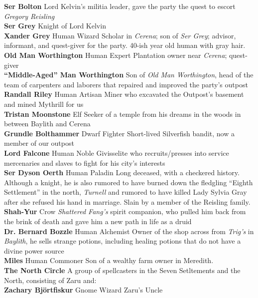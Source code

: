 \documentclass[letterpaper]{article}
\newcommand{\person}[3]{\noindent\textbf{#1
    \ifstrequal{#2}{M}{{\color{ProcessBlue}\male}}{%
    \ifstrequal{#2}{F}{\color{VioletRed}\female}{}}}{\scriptsize #3}}
\begin{document}
\person{Ser Bolton}{M}{} Lord Kelvin's militia leader, gave the party the quest to escort \emph{Gregory Reisling} \\
\person{Ser Grey}{M}{} Knight of Lord Kelvin \\
\person{Xander Grey}{M}{Human Wizard} Scholar in \emph{Cerena}; son of \emph{Ser Grey}; advisor, informant, and quest-giver for the party.  40-ish year old human with gray hair.\\
\person{Old Man Worthington}{M}{Human Expert} Plantation owner near \emph{Cerena}; quest-giver \\
\person{``Middle-Aged'' Man Worthington}{M}{} Son of \emph{Old Man Worthington}, head of the team of carpenters and laborers that repaired and improved the party's outpost \\
\person{Randall Riley}{M}{Human Artisan} Miner who excavated the Outpost's basement and mined Mythrill for us \\
\person{Tristan Moonstone}{M}{Elf} Seeker of a temple from his dreams in the woods in between Baylith and Cerena \\
\person{Grundle Bolthammer}{F}{Dwarf Fighter} Short-lived Silverfish bandit, now a member of our outpost\\
\person{Lord Falcone}{M}{Human Noble} Givisselite who recruits/presses into service mercenaries and slaves to fight for his city's interests\\
\person{Ser Dyson Oerth}{M}{Human Paladin} Long deceased, with a checkered history. Although a knight, he is also rumored to  have burned down the fledgling ``Eighth Settlement'' in the north, \emph{Turnell} and rumored to have killed Lady Sylvia Gray after she refused his hand in marriage. Slain by a member of the Reisling family.\\
\person{Shah-Yur}{M}{Crow} \emph{Shattered Fang's} spirit companion, who pulled him back from the brink of death and gave him a new path in life as a druid\\
\person{Dr. Bernard Bozzle}{M}{Human Alchemist} Owner of the shop across from \emph{Trig's} in \emph{Baylith}, he sells strange potions, including healing potions that do not have a divine power source\\
\person{Miles}{M}{Human Commoner} Son of a wealthy farm owner in Meredith. \\
\noindent\textbf{The North Circle} A group of spellcasters in the Seven Setltements and the North, consisting of Zaru and: \\
\indent\person{Zachary Bj\"{o}rtfiskur}{M}{Gnome Wizard} Zaru's Uncle \\
\end{document}
